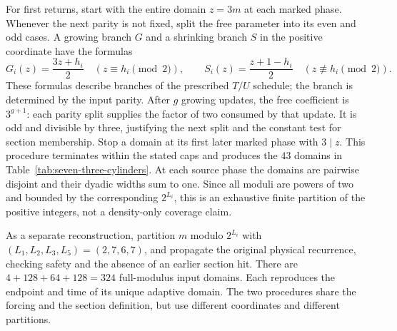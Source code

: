 For first returns, start with the entire domain $z=3m$ at each marked
phase.  Whenever the next parity is not fixed, split the free parameter
into its even and odd cases.  A growing branch $G$ and a shrinking branch
$S$ in the positive coordinate have the formulas
\[
 G_i(z)=\frac{3z+h_i}{2}\quad(z\equiv h_i\pmod2),\qquad
 S_i(z)=\frac{z+1-h_i}{2}\quad(z\not\equiv h_i\pmod2).
\]
These formulas describe branches of the prescribed $T/U$ schedule;
the branch is determined by the input parity. After $g$ growing updates,
the free coefficient is $3^{g+1}$: each parity split supplies the factor
of two consumed by that update. It is odd and divisible by three,
justifying the next split and the constant test for section membership.
Stop a domain at its
first later marked phase with $3\mid z$.  This procedure terminates
within the stated caps and produces the 43 domains in
Table~\ref{tab:seven-three-cylinders}.  At each source phase the
domains are pairwise disjoint and their dyadic widths sum to one.
Since all moduli are powers of two and bounded by the corresponding
$2^{L_i}$, this is an exhaustive finite partition of the positive
integers, not a density-only coverage claim.

As a separate reconstruction, partition $m$ modulo $2^{L_i}$ with
$(L_1,L_2,L_3,L_5)=(2,7,6,7)$, and propagate the original physical
recurrence, checking safety and the absence of an earlier section hit.
There are $4+128+64+128=324$ full-modulus input domains.  Each reproduces
the endpoint and time of its unique adaptive domain.  The two procedures
share the forcing and the section definition, but use different
coordinates and different partitions.



